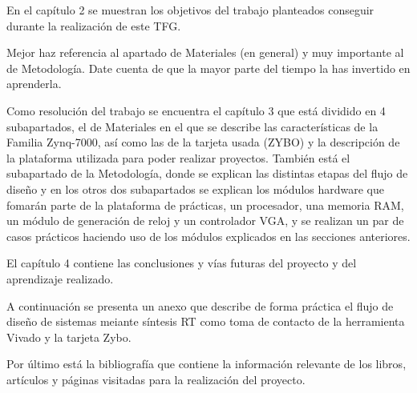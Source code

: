 En el capítulo 2 se muestran los objetivos del trabajo planteados conseguir durante la realización de este TFG.

Mejor haz referencia al apartado de Materiales (en general) y muy importante al de Metodología. Date cuenta de que la mayor parte del tiempo la has invertido en aprenderla.

Como resolución del trabajo se encuentra el capítulo 3 que está dividido en 4 subapartados, el de Materiales en el que se describe las características de la Familia 
Zynq-7000, así como las de la tarjeta usada (ZYBO) y la descripción de la plataforma utilizada para poder realizar proyectos. También está el subapartado de la Metodología, 
donde se explican las distintas etapas del flujo de diseño y en los otros dos subapartados se explican los módulos hardware que fomarán parte de la plataforma de prácticas, 
un procesador, una memoria RAM, un módulo de generación de reloj y un controlador VGA, y se realizan un par de casos prácticos haciendo uso de los módulos explicados en las secciones anteriores. 

El capítulo 4 contiene las conclusiones y vías futuras del proyecto y del aprendizaje realizado.

A continuación se presenta un anexo que describe de forma práctica el flujo de diseño de sistemas meiante síntesis RT como toma de contacto de la herramienta Vivado 
y la tarjeta Zybo.

Por último está la bibliografía que contiene la información relevante de los libros, artículos y páginas visitadas para la realización del proyecto.